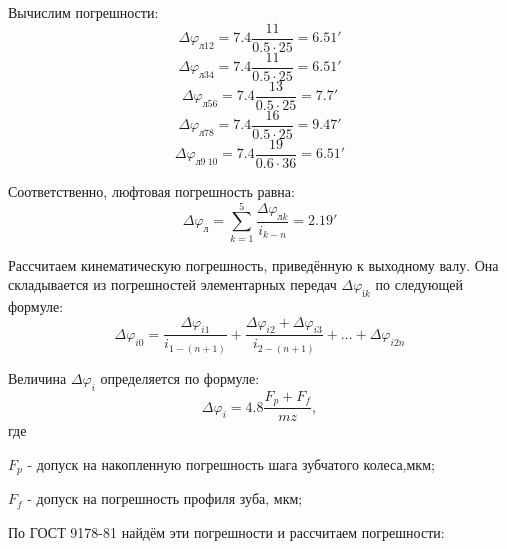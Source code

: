 \documentclass[14pt,a4paper,russian]{scrartcl}
\begin{document}
        Вычислим погрешности:
        \[ \Delta\varphi_{\text{л}12} = 7.4\frac{11}{0.5\cdot 25} = 6.51' \]
        \[ \Delta\varphi_{\text{л}34} = 7.4\frac{11}{0.5\cdot 25} = 6.51' \]
        \[ \Delta\varphi_{\text{л}56} = 7.4\frac{13}{0.5\cdot 25} = 7.7' \]
        \[ \Delta\varphi_{\text{л}78} = 7.4\frac{16}{0.5\cdot 25} = 9.47' \]
        \[ \Delta\varphi_{\text{л}9\ 10} = 7.4\frac{19}{0.6\cdot 36} = 6.51' \]
        
        Соответственно, люфтовая погрешность равна:
        \[ \Delta\varphi_{\text{л}} = \sum_{k=1}^{5}\frac{\Delta\varphi_{\text{л}k}}{i_{k-n}} = 2.19'\]
        
        Рассчитаем кинематическую погрешность, приведённую к выходному валу. Она складывается из погрешностей
        элементарных передач \( \Delta\varphi_{\text{i}k} \) по следующей формуле:
        \[ \Delta\varphi_{i0} = \frac{\Delta\varphi_{i1}}{i_{1-(n+1)}} +  
        \frac{\Delta\varphi_{i2}+\Delta\varphi_{i3}}{i_{2-(n+1)}} + ... + \Delta\varphi_{i2n} \]

        Величина \( \Delta\varphi_{i} \) определяется по формуле:
        \[ \Delta\varphi_{i} = 4.8\frac{F_p+F_f}{mz}, \]
        где\par
            \qquad\( F_p \) - допуск на накопленную погрешность шага зубчатого колеса,мкм;\par
            \qquad\( F_f \) - допуск на погрешность профиля зуба, мкм;\par
        
        По ГОСТ 9178-81 найдём эти погрешности и рассчитаем погрешности:
        
\end{document}
